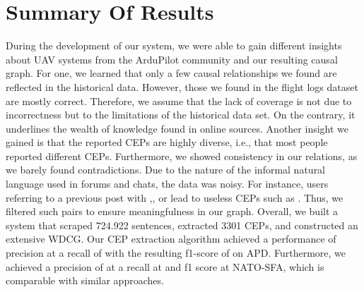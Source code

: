\section{Summary Of Results}\label{sec:results}
During the development of our system, we were able to gain different insights about \ac{UAV} systems from the ArduPilot community and our resulting causal graph.
For one, we learned that only a few causal relationships we found are reflected in the historical data.
However, those we found in the flight logs dataset are mostly correct.
Therefore, we assume that the lack of coverage is not due to incorrectness but to the limitations of the historical data set.
On the contrary, it underlines the wealth of knowledge found in online sources.
Another insight we gained is that the reported \ac{CEP}s are highly diverse, i.e., that most people reported different \ac{CEP}s.
Furthermore, we showed consistency in our relations, as we barely found contradictions.
Due to the nature of the informal natural language used in forums and chats, the data was noisy.
For instance, users referring to a previous post with ,, or  lead to useless \ac{CEP}s such as .
Thus, we filtered such pairs to ensure meaningfulness in our graph.
Overall, we built a system that scraped 724.922 sentences, extracted 3301 \ac{CEP}s, and constructed an extensive \ac{WDCG}.
Our \ac{CEP} extraction algorithm achieved a performance of  precision at a recall of  with the resulting f1-score of  on \ac{APD}.
Furthermore, we achieved a precision of  at a recall at  and  f1 score at \ac{NATO-SFA}, which is comparable with similar approaches.


